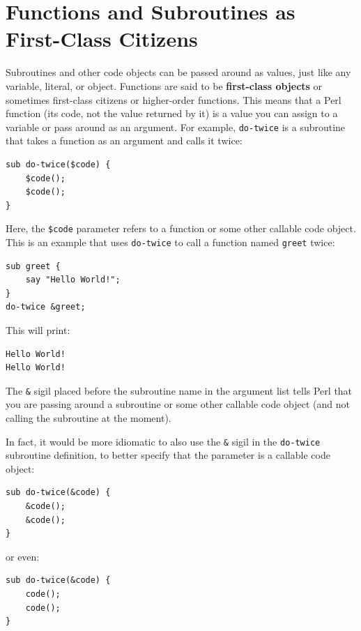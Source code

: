 \section{Functions and Subroutines as First-Class Citizens}
\label{first_class}

Subroutines and other code objects can be passed around as values, 
just like any variable, literal, or object. Functions are said 
to be {\bf first-class objects} or sometimes first-class 
citizens or higher-order functions. This means that a Perl 
function (its code, not the value returned by it) is a value 
you can assign to a variable or pass around as an argument. 
For example, \verb"do-twice" is a subroutine that takes a 
function as an argument and calls it twice:

\begin{verbatim}
sub do-twice($code) {
    $code(); 
    $code();
}
\end{verbatim}

Here, the \verb"$code" parameter refers to a function or some
other callable code object. This is an example that uses
\verb"do-twice" to call a function named \verb"greet" twice:

\begin{verbatim}
sub greet {
    say "Hello World!";
}
do-twice &greet;
\end{verbatim}

This will print:
\begin{verbatim}
Hello World!
Hello World!
\end{verbatim}

The \verb"&" sigil placed before the subroutine name in the 
argument list tells Perl that you are passing around a 
subroutine or some other callable code object (and not 
calling the subroutine at the moment).

In fact, it would be more idiomatic to also use the \verb"&" 
sigil in the \verb"do-twice" subroutine definition, to better 
specify that the parameter is a callable code object:

\begin{verbatim}
sub do-twice(&code) {
    &code(); 
    &code();
}
\end{verbatim}

or even:
\begin{verbatim}
sub do-twice(&code) {
    code(); 
    code();
}
\end{verbatim}

